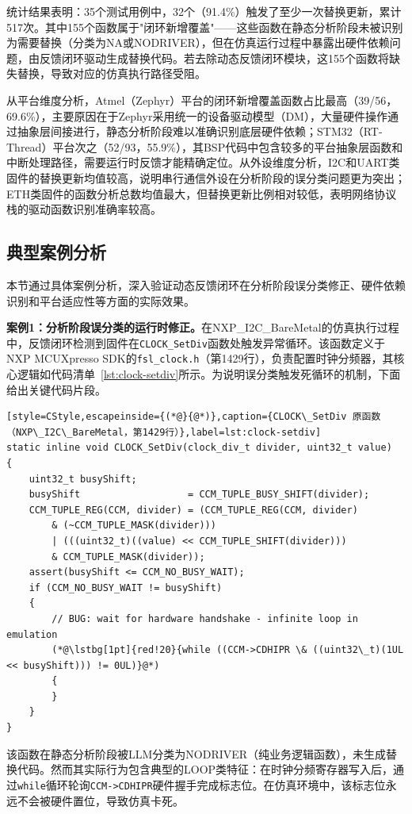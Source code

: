 统计结果表明：35个测试用例中，32个（91.4\%）触发了至少一次替换更新，累计517次。其中155个函数属于"闭环新增覆盖"——这些函数在静态分析阶段未被识别为需要替换（分类为NA或NODRIVER），但在仿真运行过程中暴露出硬件依赖问题，由反馈闭环驱动生成替换代码。若去除动态反馈闭环模块，这155个函数将缺失替换，导致对应的仿真执行路径受阻。

从平台维度分析，Atmel（Zephyr）平台的闭环新增覆盖函数占比最高（39/56，69.6\%），主要原因在于Zephyr采用统一的设备驱动模型（DM），大量硬件操作通过抽象层间接进行，静态分析阶段难以准确识别底层硬件依赖；STM32（RT-Thread）平台次之（52/93，55.9\%），其BSP代码中包含较多的平台抽象层函数和中断处理路径，需要运行时反馈才能精确定位。从外设维度分析，I2C和UART类固件的替换更新均值较高，说明串行通信外设在分析阶段的误分类问题更为突出；ETH类固件的函数分析总数均值最大，但替换更新比例相对较低，表明网络协议栈的驱动函数识别准确率较高。

\subsection{典型案例分析}

本节通过具体案例分析，深入验证动态反馈闭环在分析阶段误分类修正、硬件依赖识别和平台适应性等方面的实际效果。

\textbf{案例1：分析阶段误分类的运行时修正。}在NXP\_I2C\_BareMetal的仿真执行过程中，反馈闭环检测到固件在\texttt{CLOCK\_SetDiv}函数处触发异常循环。该函数定义于NXP MCUXpresso SDK的\texttt{fsl\_clock.h}（第1429行），负责配置时钟分频器，其核心逻辑如代码清单~\ref{lst:clock-setdiv}所示。为说明误分类触发死循环的机制，下面给出关键代码片段。

\begin{lstlisting}[style=CStyle,escapeinside={(*@}{@*)},caption={CLOCK\_SetDiv 原函数（NXP\_I2C\_BareMetal，第1429行）},label=lst:clock-setdiv]
static inline void CLOCK_SetDiv(clock_div_t divider, uint32_t value)
{
    uint32_t busyShift;
    busyShift                   = CCM_TUPLE_BUSY_SHIFT(divider);
    CCM_TUPLE_REG(CCM, divider) = (CCM_TUPLE_REG(CCM, divider)
        & (~CCM_TUPLE_MASK(divider)))
        | (((uint32_t)((value) << CCM_TUPLE_SHIFT(divider)))
        & CCM_TUPLE_MASK(divider));
    assert(busyShift <= CCM_NO_BUSY_WAIT);
    if (CCM_NO_BUSY_WAIT != busyShift)
    {
        // BUG: wait for hardware handshake - infinite loop in emulation
        (*@\lstbg[1pt]{red!20}{while ((CCM->CDHIPR \& ((uint32\_t)(1UL << busyShift))) != 0UL)}@*)
        {
        }
    }
}
\end{lstlisting}

该函数在静态分析阶段被LLM分类为NODRIVER（纯业务逻辑函数），未生成替换代码。然而其实际行为包含典型的LOOP类特征：在时钟分频寄存器写入后，通过\texttt{while}循环轮询\texttt{CCM-\textgreater{}CDHIPR}硬件握手完成标志位。在仿真环境中，该标志位永远不会被硬件置位，导致仿真卡死。

